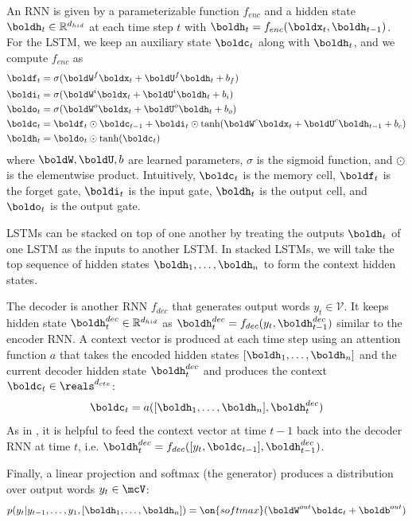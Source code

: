 \documentclass[12pt]{report}
\begin{document}
An RNN is given by a parameterizable function $f_{enc}$ and a hidden state $\boldh_t \in \mathbb{R}^{ d_{hid}}$ at each time step $t$ with $\boldh_t = f_{enc}(\boldx_t, \boldh_{t-1})$. For the LSTM, we keep an auxiliary state $\boldc_t$ along with $\boldh_t$, and we compute $f_{enc}$ as
\begin{align}
\boldf_t &= \sigma(\boldW^f \boldx_t + \boldU^f \boldh_t + b_f) \\
\boldi_t &= \sigma(\boldW^i \boldx_t + \boldU^i \boldh_t + b_i) \\
\boldo_t &= \sigma(\boldW^o \boldx_t + \boldU^o \boldh_t + b_o) \\
\boldc_t &= \boldf_t \odot \boldc_{t-1}  + \boldi_t \odot \tanh(\boldW^c \boldx_t + \boldU^c \boldh_{t-1} + b_c) \\
\boldh_t &= \boldo_t \odot \tanh(\boldc_t)
\end{align}
where $\boldW, \boldU, b$ are learned parameters, $\sigma$ is the sigmoid function, and $\odot$ is the elementwise product. 
Intuitively, $\boldc_t$ is the memory cell, $\boldf_t$ is the forget gate, $\boldi_t$ is the input gate, $\boldh_t$ is the output cell, and $\boldo_t$ is the output gate.

LSTMs can be stacked on top of one another by treating the outputs $\boldh_t$ of one LSTM as the inputs to another LSTM. In stacked LSTMs, we will take the top sequence of hidden states $\boldh_1, \ldots, \boldh_n$ to form the context hidden states.


The decoder is another RNN $f_{dec}$ that generates output words $y_t \in \mathcal{V}$. It keeps hidden state $\boldh_t^{dec} \in \mathbb{R}^{d_{hid}}$ as $\boldh_t^{dec} = f_{dec}(y_t, \boldh_{t-1}^{dec})$ similar to the encoder RNN.
A context vector is produced at each time step using an attention function $a$ that takes the encoded hidden states $[\boldh_1, \ldots, \boldh_n]$ and the current decoder hidden state $\boldh_t^{dec}$ and produces the context $\boldc_t \in \reals^{d_{ctx}}$:
\begin{equation}
\boldc_t = a([\boldh_1, \ldots, \boldh_n], \boldh_t^{dec})
\end{equation}
As in \citet{luong2015effective}, it is helpful to feed the context vector at time $t-1$ back into the decoder RNN at time $t$, i.e. $\boldh_t^{dec} = f_{dec}([y_t, \boldc_{t-1}], \boldh_{t-1}^{dec})$.

Finally, a linear projection and softmax (the generator) produces a distribution over output words $y_t \in \mcV$:
\begin{equation}
p(y_t | y_{t-1}, \ldots, y_1, [\boldh_1, \ldots, \boldh_n]) = \on{softmax}(\boldW^{out}\boldc_t + \boldb^{out})
\end{equation}
\end{document}
